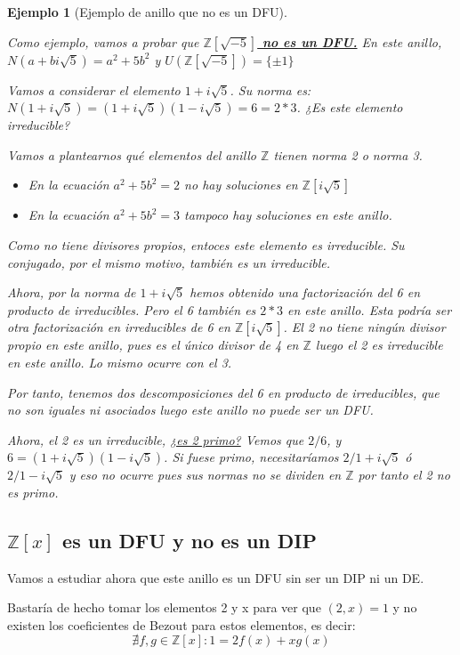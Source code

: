 \documentclass[11pt, a4paper, titlepage]{article}
\providecommand{\ent}{\mathbb{Z}}
\theoremstyle{theorem-style}
\theoremstyle{definition-style}
\theoremstyle{remark-style}
\theoremstyle{example-style}
\newtheorem*{ejemplo}{Ejemplo}
\begin{document}
\begin{ejemplo}[Ejemplo de anillo que no es un DFU] $\quad$

Como ejemplo, vamos a probar que \textbf{\underline{$\ent[\sqrt{-5}]$ no es un DFU.}} En este anillo, $N(a+bi\sqrt5) = a^2 + 5b^2$ y $U(\ent[\sqrt{-5}])= \{\pm 1\}$

Vamos a considerar el elemento $1+i\sqrt5$. Su norma es: $N(1+i\sqrt5) = (1+i\sqrt5)(1-i\sqrt5) = 6 = 2 * 3$. ¿Es este elemento irreducible?

Vamos a plantearnos qué elementos del anillo $\ent$ tienen norma 2 o norma 3.
\begin{itemize}
	\item En la ecuación $a^2+5b^2= 2$ no hay soluciones en $\ent[i\sqrt5]$
	\item En la ecuación $a^2+5b^2 = 3$ tampoco hay soluciones en este anillo.
\end{itemize}
	Como no tiene divisores propios, entoces este elemento es irreducible. Su conjugado, por el mismo motivo, también es un irreducible.
	
	Ahora, por la norma de $1+i\sqrt5$ hemos obtenido una factorización del 6 en producto de irreducibles. Pero el 6 también es $2*3$ en este anillo. Esta podría ser otra factorización en irreducibles de 6 en $\ent [i\sqrt5]$. El 2 no tiene ningún divisor propio en este anillo, pues es el único divisor de 4 en $\ent$ luego el 2 es irreducible en este anillo. Lo mismo ocurre con el 3.
	
	Por tanto, tenemos dos descomposiciones del 6 en producto de irreducibles, que no son iguales ni asociados luego este anillo no puede ser un DFU.
	
	Ahora, el 2 es un irreducible, \underline{¿es 2 primo?} Vemos que $2/6$, y $6 = (1+i\sqrt5)(1-i\sqrt5)$. Si fuese primo, necesitaríamos $2/1+i\sqrt5$ ó $2/1-i\sqrt5$ y eso no ocurre pues sus normas no se dividen en $\ent$ por tanto el 2 no es primo.
\end{ejemplo}

\subsection{$\ent[x]$ es un DFU y no es un DIP}

Vamos a estudiar ahora que este anillo es un DFU sin ser un DIP ni un DE.

Bastaría de hecho tomar los elementos 2 y x para ver que $(2,x) = 1$ y no existen los coeficientes de Bezout para estos elementos, es decir:
\[
\nexists f,g \in \ent[x] : 1 = 2f(x)+ xg(x)
\]
\end{document}
